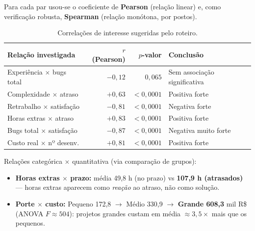 \documentclass[a4paper, 12pt]{article}
\begin{document}
Para cada par usou-se o coeficiente de \textbf{Pearson} (relação linear) e, como
verificação robusta, \textbf{Spearman} (relação monótona, por postos).

\begin{table}[H]
\centering
\caption{Correlações de interesse sugeridas pelo roteiro.}
\label{tab:correlacoes}
\begin{tabularx}{\textwidth}{@{} L r r L @{}}
\toprule
\textbf{Relação investigada} & \textbf{$r$ (Pearson)} & \textbf{$p$-valor} & \textbf{Conclusão} \\
\midrule
Experiência $\times$ bugs total & $-0{,}12$ & $0{,}065$     & Sem associação significativa \\
Complexidade $\times$ atraso    & $+0{,}63$ & $<0{,}0001$   & Positiva forte \\
Retrabalho $\times$ satisfação  & $-0{,}81$ & $<0{,}0001$   & Negativa forte \\
Horas extras $\times$ atraso    & $+0{,}83$ & $<0{,}0001$   & Positiva forte \\
Bugs total $\times$ satisfação  & $-0{,}87$ & $<0{,}0001$   & Negativa muito forte \\
Custo real $\times$ nº desenv.  & $+0{,}81$ & $<0{,}0001$   & Positiva forte \\
\bottomrule
\end{tabularx}
\end{table}

Relações categórica $\times$ quantitativa (via comparação de grupos):
\begin{itemize}[noitemsep]
	\item \textbf{Horas extras $\times$ prazo:} média 49,8 h (no prazo) vs
	      \textbf{107,9 h (atrasados)} --- horas extras aparecem como
	      \emph{reação} ao atraso, não como solução.
	\item \textbf{Porte $\times$ custo:} Pequeno 172,8 $\to$ Médio 330,9 $\to$
	      \textbf{Grande 608,3} mil R\$ (ANOVA $F \approx 504$): projetos grandes
	      custam em média $\approx 3{,}5\times$ mais que os pequenos.
\end{itemize}
\end{document}
